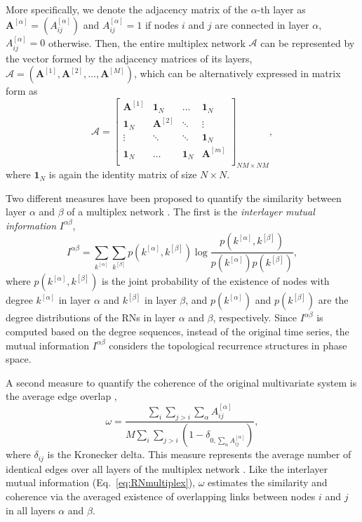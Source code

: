 		More specifically, we denote the adjacency matrix of the $\alpha$-th layer as $\mathbf{A}^{[\alpha]} = \left(A_{ij}^{[\alpha]}\right)$ and $A_{ij}^{[\alpha]} = 1$ if nodes $i$ and $j$ are connected in layer $\alpha$, $A_{ij}^{[\alpha]}= 0$ otherwise. Then, the entire multiplex network $\mathcal{A}$ can be represented by the vector formed by the adjacency matrices of its layers, $\mathbf{\mathcal{A}} = (\mathbf{A}^{[1]}, \mathbf{A}^{[2]}, \dots, \mathbf{A}^{[M]})$, which can be alternatively expressed in matrix form as
		\begin{equation}
\mathbf{\mathcal{A}} = \left[ \begin{array}{cccc}
\mathbf{A}^{[1]} & \mathbf{1}_{N} & \ldots             & \mathbf{1}_{N}\\
\mathbf{1}_{N} & \mathbf{A}^{[2]} & \ddots             & \vdots   \\
\vdots                & \ddots                & \ddots            & \mathbf{1}_{N} \\
\mathbf{1}_{N} & \ldots                 & \mathbf{1}_{N} & \mathbf{A}^{[m]}\\
\end{array} \right]_{NM \times NM},
		\end{equation}
where $\mathbf{1}_{N}$ is again the identity matrix of size $N\times N$.

		Two different measures have been proposed to quantify the similarity between layer $\alpha$ and $\beta$ of a multiplex network \cite{Eroglu2018,Lacasa2015b}. The first is the \emph{interlayer mutual information} $I^{\alpha\beta}$,
		\begin{equation} \label{eq:RNmultiplex}
		I^{\alpha\beta} = \sum_{k^{[\alpha]}} \sum_{k^{[\beta]}} p(k^{[\alpha]}, k^{[\beta]}) \log \frac{p(k^{[\alpha]}, k^{[\beta]})}{p(k^{[\alpha]}) p(k^{[\beta]}) },
		\end{equation}
where $p(k^{[\alpha]}, k^{[\beta]}) $ is the joint probability of the existence of nodes with degree $k^{[\alpha]}$ in layer $\alpha$ and $k^{[\beta]}$ in layer $\beta$, and $p(k^{[\alpha]})$ and $p(k^{[\beta]}) $ are the degree distributions of the RNs in layer $\alpha$ and $\beta$, respectively. Since $I^{\alpha\beta}$ is computed based on the degree sequences, instead of the original time series, the mutual information $I^{\alpha\beta}$ considers the topological recurrence structures in phase space.

		A second measure to quantify the coherence of the original multivariate system is the average edge overlap \cite{Eroglu2018,Lacasa2015b},
		\begin{equation} \label{eq:RNmultiplexW}
			\omega = \frac{\sum_i\sum_{j>i} \sum_{\alpha}A_{ij}^{[\alpha]}}{M \sum_i\sum_{j>i}(1-\delta_{0, \sum_{\alpha}A_{ij}^{[\alpha]}})},
		\end{equation}
		where $\delta_{ij}$ is the Kronecker delta. This measure represents the average number of identical edges over all layers of the multiplex network \cite{Lacasa2015b}. Like the interlayer mutual information (Eq.~\ref{eq:RNmultiplex}), $\omega$ estimates the similarity and coherence via the averaged existence of overlapping links between nodes $i$ and $j$ in all layers $\alpha$ and $\beta$.

